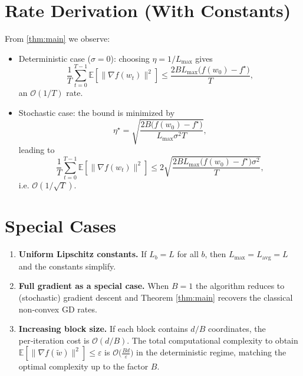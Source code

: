\documentclass[11pt]{article}
\newcommand{\EE}{\mathbb{E}}
\newcommand{\grad}{\nabla}
\begin{document}
\section*{Rate Derivation (With Constants)}
From \eqref{thm:main} we observe:
\begin{itemize}
\item Deterministic case ($\sigma=0$): choosing $\eta=1/L_{\max}$ gives
\[
\frac{1}{T}\sum_{t=0}^{T-1}\EE[\|\grad f(w_t)\|^2]
\le
\frac{2BL_{\max}\big(f(w_0)-f^\star\big)}{T},
\]
an $\mathcal{O}(1/T)$ rate.
\item Stochastic case: the bound is minimized by
\[
\eta^\star = \sqrt{\frac{2B\big(f(w_0)-f^\star\big)}{L_{\max}\sigma^{2}T}},
\]
leading to
\[
\frac{1}{T}\sum_{t=0}^{T-1}\EE[\|\grad f(w_t)\|^2]
\le
2\sqrt{\frac{2BL_{\max}\big(f(w_0)-f^\star\big)\sigma^{2}}{T}} ,
\]
i.e. $\mathcal{O}(1/\sqrt{T})$.
\end{itemize}

\section*{Special Cases}
\begin{enumerate}
\item \textbf{Uniform Lipschitz constants.} If $L_b=L$ for all $b$, then $L_{\max}=L_{\text{avg}}=L$ and the constants simplify.
\item \textbf{Full gradient as a special case.} When $B=1$ the algorithm reduces to (stochastic) gradient descent and Theorem \ref{thm:main} recovers the classical non‑convex GD rates.
\item \textbf{Increasing block size.} If each block contains $d/B$ coordinates, the per‑iteration cost is $\mathcal{O}(d/B)$.  The total computational complexity to obtain $\EE[\|\grad f(\tilde w)\|^2]\le\varepsilon$ is $\mathcal{O}\big(\tfrac{Bd}{\varepsilon}\big)$ in the deterministic regime, matching the optimal complexity up to the factor $B$.
\end{enumerate}
\end{document}
